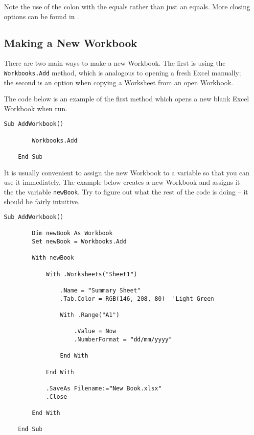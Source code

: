 \documentclass[11pt]{article}%
\begin{document}
Note the use of the colon with the equals rather than just an equals. More closing options can be found in \cite{WorkbooksClose}.


\subsection{Making a New Workbook}

There are two main ways to make a new Workbook. The first is using the \texttt{Workbooks.Add} method, which is analogous to opening a fresh Excel manually; the second is an option when copying a Worksheet from an open Workbook.

The code below is an example of the first method which opens a new blank Excel Workbook when run.\\

\begin{lstlisting}[style=A]
    Sub AddWorkbook()

        Workbooks.Add

    End Sub
\end{lstlisting}

It is usually convenient to assign the new Workbook to a variable so that you can use it immediately. The example below creates a new Workbook and assigns it the the variable \texttt{newBook}. Try to figure out what the rest of the code is doing -- it should be fairly intuitive.\\

\begin{lstlisting}[style=A]
    Sub AddWorkbook()

        Dim newBook As Workbook
        Set newBook = Workbooks.Add

        With newBook

            With .Worksheets("Sheet1")

                .Name = "Summary Sheet"
                .Tab.Color = RGB(146, 208, 80)  'Light Green

                With .Range("A1")

                    .Value = Now
                    .NumberFormat = "dd/mm/yyyy"

                End With

            End With

            .SaveAs Filename:="New Book.xlsx"
            .Close

        End With

    End Sub
\end{lstlisting}
\end{document}
